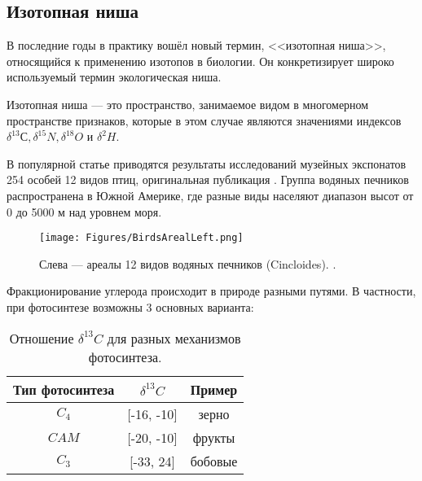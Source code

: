 \documentclass[a5paper,openany]{book}
\begin{document}

\subsection{Изотопная ниша}\label{s:IsotopeNiche}

В последние годы в практику вошёл новый термин, <<изотопная ниша>>, относящийся к применению изотопов в биологии. Он конкретизирует широко используемый термин экологическая ниша. 

Изотопная ниша — это пространство, занимаемое видом в многомерном пространстве признаков, которые в этом случае являются значениями индексов $\delta^{13}С, \delta^{15}N, \delta^{18}O \text{ и } \delta^{2}H$. 

В популярной статье \cite{OpaevIsotope} приводятся результаты исследований музейных экспонатов 254 особей 12 видов птиц, оригинальная публикация \cite{Rader2017}.  Группа водяных печников распространена в Южной Америке, где разные виды населяют диапазон высот от 0 до 5000 м над уровнем моря.
\begin{figure}[ht] 
	\centering\small
	\unitlength=1mm
	{\texttt{[image: Figures/BirdsArealLeft.png]}} 
	\caption {Слева — ареалы 12 видов водяных печников (Cincloides). \cite{Rader2017}.} %
\label{f:BirdsAreal}
\end{figure}

Фракционирование углерода происходит в природе разными путями. В частности, при фотосинтезе возможны 3 основных варианта: 
\begin{table}[h!]
\centering
\caption{Отношение $\delta^{13}C$ для разных механизмов фотосинтеза.} 
\medskip 
\begin{tabular}{|c|c|c|}
	\hline
	Тип фотосинтеза & $\delta^{13}C$ & Пример \\
	\hline 
	$C_4$ & [-16, -10] & зерно \\
	$CAM$ & [-20, -10] & фрукты\\
	$C_3$ & [-33, 24] & бобовые \\			
	\hline
\end{tabular}
\label{13Cplants}
\end{table} 
\end{document}
